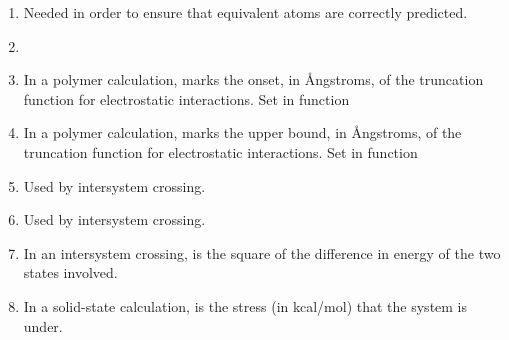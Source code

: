 \begin{enumerate}
\item {}  Needed in order to ensure that equivalent atoms are correctly
predicted.
\item {}
\item {}  In a polymer calculation,  marks the onset,
in \AA ngstroms, of the truncation function for electrostatic interactions.
Set in function 
\item {}  In a polymer calculation,  marks the upper bound,
in \AA ngstroms, of the truncation function for electrostatic interactions.
Set in function 
\item {}  Used by intersystem crossing.
\item {}  Used by intersystem crossing.
\item {}  In an intersystem crossing,  is the square
of the difference in energy of the two states involved.
\item {} In a solid-state calculation,  is the stress
(in kcal/mol) that the system is under.
\end{enumerate}
